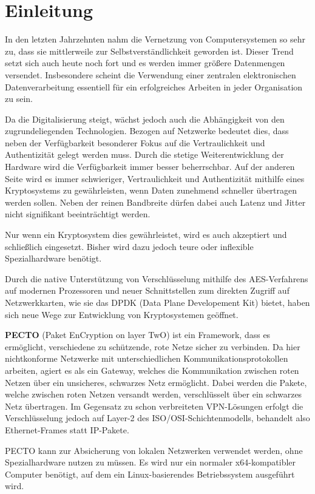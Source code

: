 \section{Einleitung}

In den letzten Jahrzehnten nahm die Vernetzung von Computersystemen so sehr zu, dass sie mittlerweile zur Selbstverständlichkeit geworden ist.
Dieser Trend setzt sich auch heute noch fort und es werden immer größere Datenmengen versendet.
Insbesondere scheint die Verwendung einer zentralen elektronischen Datenverarbeitung essentiell für ein erfolgreiches Arbeiten in jeder Organisation zu sein. 

Da die Digitalisierung steigt, wächst jedoch auch die Abhängigkeit von den zugrundeliegenden Technologien. 
Bezogen auf Netzwerke bedeutet dies, dass neben der Verfügbarkeit besonderer Fokus auf die Vertraulichkeit und Authentizität gelegt werden muss.  
Durch die stetige Weiterentwicklung der Hardware wird die Verfügbarkeit immer besser beherrschbar. 
Auf der anderen Seite wird es immer schwieriger, Vertraulichkeit und Authentizität mithilfe eines Kryptosystems zu gewährleisten, wenn Daten zunehmend schneller übertragen werden sollen. 
Neben der reinen Bandbreite dürfen dabei auch Latenz und Jitter nicht signifikant beeinträchtigt werden.

Nur wenn ein Kryptosystem dies gewährleistet, wird es auch akzeptiert und schließlich eingesetzt. Bisher wird dazu jedoch teure oder inflexible Spezialhardware benötigt.

Durch die native Unterstützung von Verschlüsselung mithilfe des AES-Verfahrens auf modernen Prozessoren und neuer Schnittstellen zum direkten Zugriff auf Netzwerkkarten, wie sie das DPDK (Data Plane Developement Kit) bietet, haben sich neue Wege zur Entwicklung von Kryptosystemen geöffnet.

\textbf{PECTO} (Paket EnCryption on layer TwO) ist ein Framework, dass es ermöglicht, verschiedene zu schützende, rote Netze sicher zu verbinden. 
Da hier nichtkonforme Netzwerke mit unterschiedlichen Kommunikationsprotokollen arbeiten, agiert es als ein Gateway, welches die Kommunikation zwischen roten Netzen über ein unsicheres, schwarzes Netz ermöglicht. 
Dabei werden die Pakete, welche zwischen roten Netzen versandt werden, verschlüsselt über ein schwarzes Netz übertragen.
Im Gegensatz zu schon verbreiteten VPN-Lösungen erfolgt die Verschlüsselung jedoch auf Layer-2 des ISO/OSI-Schichtenmodells, behandelt also Ethernet-Frames statt IP-Pakete.

PECTO kann zur Absicherung von lokalen Netzwerken verwendet werden, ohne Spezialhardware nutzen zu müssen.
Es wird nur ein normaler x64-kompatibler Computer benötigt, auf dem ein Linux-basierendes Betriebssystem ausgeführt wird.